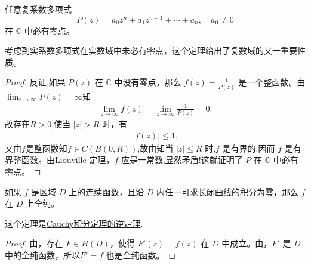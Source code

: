 \documentclass[../../main.tex]{subfiles}%
\begin{document}
\begin{theorem}[代数学基本定理]\label{theorem:代数学基本定理}
任意复系数多项式
\[
P(z) = a_0 z^n + a_1 z^{n - 1} + \cdots + a_n, \quad a_0 \neq 0
\]
在 \( \mathbb{C} \) 中必有零点。
\end{theorem}
\begin{note}
考虑到实系数多项式在实数域中未必有零点，这个定理给出了复数域的又一重要性质。
\end{note}
\begin{proof}

反证,如果 \( P(z) \) 在 \( \mathbb{C} \) 中没有零点，那么 \( f(z) = \frac{1}{P(z)} \) 是一个整函数。由\( \lim_{z \to \infty} P(z) = \infty \)知
\begin{align*}
\lim_{z\rightarrow \infty} f\left( z \right) =\lim_{z\rightarrow \infty} \frac{1}{P(z)}=0.
\end{align*}
故存在$R>0$,使当 \( |z| > R \) 时，有
\begin{align*}
|f(z)|\leqslant 1.
\end{align*}
又由$f$是整函数知$f\in C(B(0,R))$,故由知当 \( |z| \leqslant R \) 时,\( f \) 是有界的.因而 \( f \) 是有界整函数。由\hyperref[theorem:Liouville(刘维尔)定理]{Liouville 定理}，\( f \) 应是一常数,显然矛盾!这就证明了 \( P \) 在 \( \mathbb{C} \) 中必有零点。

\end{proof}

\begin{theorem}[Morera定理]\label{theorem:Morera(莫雷拉)定理}
如果 \( f \) 是区域 \( D \) 上的连续函数，且沿 \( D \) 内任一可求长闭曲线的积分为零，那么 \( f \) 在 \( D \) 上全纯。
\end{theorem}
\begin{note}
这个定理是\hyperref[theorem:Cauchy-Goursat定理(Cauchy积分定理)]{Cauchy积分定理的逆定理}.
\end{note}
\begin{proof}

由，存在 \( F \in H(D) \)，使得 \( F'(z) = f(z) \) 在 \( D \) 中成立。由，\( F' \) 是 \( D \) 中的全纯函数，所以\(F' = f \) 也是全纯函数。

\end{proof}
\end{document}
